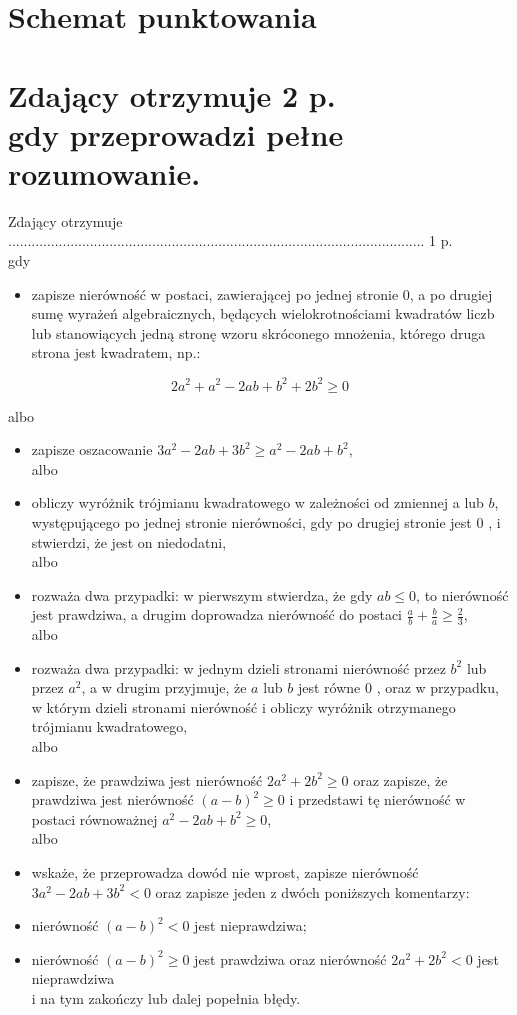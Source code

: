 \documentclass[10pt]{article}
\begin{document}
\section*{Schemat punktowania}
\section*{Zdający otrzymuje 2 p. \\
 gdy przeprowadzi pełne rozumowanie.}
Zdający otrzymuje ........................................................................................................... 1 p.\\
gdy

\begin{itemize}
  \item zapisze nierówność w postaci, zawierającej po jednej stronie 0, a po drugiej sumę wyrażeń algebraicznych, będących wielokrotnościami kwadratów liczb lub stanowiących jedną stronę wzoru skróconego mnożenia, którego druga strona jest kwadratem, np.:
\end{itemize}

$$
2 a^{2}+a^{2}-2 a b+b^{2}+2 b^{2} \geq 0
$$

albo

\begin{itemize}
  \item zapisze oszacowanie $3 a^{2}-2 a b+3 b^{2} \geq a^{2}-2 a b+b^{2}$,\\
albo
  \item obliczy wyróżnik trójmianu kwadratowego w zależności od zmiennej a lub $b$, występującego po jednej stronie nierówności, gdy po drugiej stronie jest 0 , i stwierdzi, że jest on niedodatni,\\
albo
  \item rozważa dwa przypadki: w pierwszym stwierdza, że gdy $a b \leq 0$, to nierówność jest prawdziwa, a drugim doprowadza nierówność do postaci $\frac{a}{b}+\frac{b}{a} \geq \frac{2}{3}$,\\
albo
  \item rozważa dwa przypadki: w jednym dzieli stronami nierówność przez $b^{2}$ lub przez $a^{2}$, a w drugim przyjmuje, że $a$ lub $b$ jest równe 0 , oraz w przypadku, w którym dzieli stronami nierówność i obliczy wyróżnik otrzymanego trójmianu kwadratowego,\\
albo
  \item zapisze, że prawdziwa jest nierówność $2 a^{2}+2 b^{2} \geq 0$ oraz zapisze, że prawdziwa jest nierówność $(a-b)^{2} \geq 0$ i przedstawi tę nierówność w postaci równoważnej $a^{2}-2 a b+b^{2} \geq 0$,\\
albo
  \item wskaże, że przeprowadza dowód nie wprost, zapisze nierówność $3 a^{2}-2 a b+3 b^{2}<0$ oraz zapisze jeden z dwóch poniższych komentarzy:
  \item nierówność $(a-b)^{2}<0$ jest nieprawdziwa;
  \item nierówność $(a-b)^{2} \geq 0$ jest prawdziwa oraz nierówność $2 a^{2}+2 b^{2}<0$ jest nieprawdziwa\\
i na tym zakończy lub dalej popełnia błędy.
\end{itemize}
\end{document}
